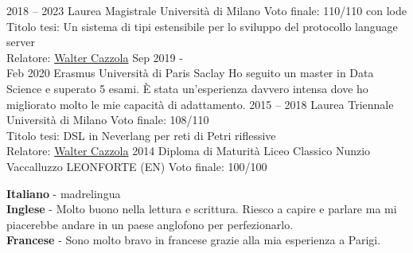 \documentclass[9pt]{developercv} %
\begin{document}
\begin{entrylist}
	\entry
		{2018 -- 2023}
		{Laurea Magistrale}
		{Università di Milano}
		{
			Voto finale: 110/110 con lode\\
			Titolo tesi: Un sistema di tipi estensibile per lo sviluppo del protocollo language server\\
			Relatore: \href{https://cazzola.di.unimi.it}{Walter Cazzola}
		}
	\entry
	{Sep 2019 - \\Feb 2020}
	{Erasmus}
	{Università di Paris Saclay}
	{
		Ho seguito un master in Data Science e superato 5 esami.
		È stata un'esperienza davvero intensa dove ho migliorato molto le mie capacità di adattamento.
	}
	\entry
	{2015 -- 2018}
	{Laurea Triennale}
	{Università di Milano}
	{
		Voto finale: 108/110\\
		Titolo tesi: DSL in Neverlang per reti di Petri riflessive\\
		Relatore: \href{https://cazzola.di.unimi.it}{Walter Cazzola}
	}
	\entry
	{2014}
	{Diploma di Maturità}
	{Liceo Classico Nunzio Vaccalluzzo LEONFORTE (EN)}
	{
		Voto finale: 100/100\\
	}
\end{entrylist}


\begin{minipage}[t]{0.5\textwidth}
	\vspace{-\baselineskip} %


	\textbf{Italiano} - madrelingua\\
	\textbf{Inglese} - Molto buono nella lettura e scrittura. Riesco a capire e parlare ma mi piacerebbe andare in un paese anglofono per perfezionarlo.\\
	\textbf{Francese} - Sono molto bravo in francese grazie alla mia esperienza a Parigi.
\end{minipage}
\hfill
\begin{minipage}[t]{0.3\textwidth}
	\vspace{-\baselineskip} %


\end{minipage}


\end{document}
